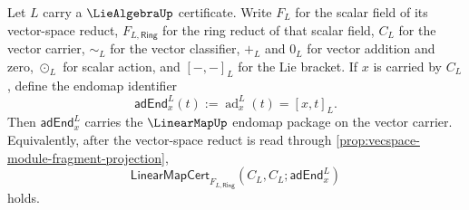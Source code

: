 \begin{theorem}
\label{thm:liealgebra-adjoint-linearmap-endomap-package}
Let $L$ carry a $\LieAlgebraUp$ certificate. Write $F_L$ for the scalar field of its vector-space reduct, $F_{L,\mathsf{Ring}}$ for the ring reduct of that scalar field, $C_L$ for the vector carrier, $\sim_L$ for the vector classifier, $+_L$ and $0_L$ for vector addition and zero, $\odot_L$ for scalar action, and $[-,-]_L$ for the Lie bracket. If $x$ is carried by $C_L$, define the endomap identifier
$$
\mathsf{adEnd}^{L}_{x}(t):=\operatorname{ad}^{L}_{x}(t)=[x,t]_L.
$$
Then $\mathsf{adEnd}^{L}_{x}$ carries the $\LinearMapUp$ endomap package on the vector carrier. Equivalently, after the vector-space reduct is read through \autoref{prop:vecspace-module-fragment-projection},
$$
\mathsf{LinearMapCert}_{F_{L,\mathsf{Ring}}}(C_L,C_L;\mathsf{adEnd}^{L}_{x})
$$
holds.
\end{theorem}
